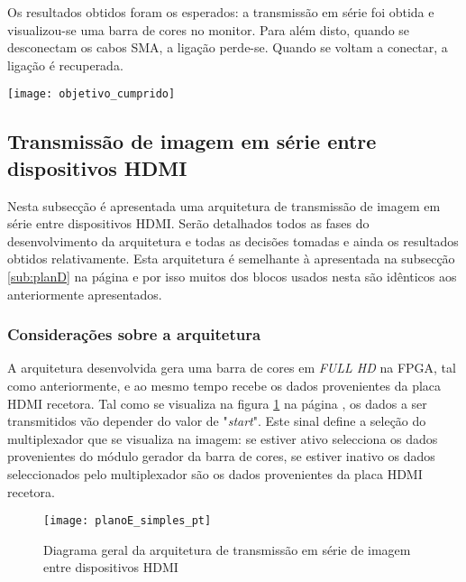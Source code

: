 Os resultados obtidos foram os esperados: a transmissão em série foi obtida e visualizou-se uma barra de cores no monitor. Para além disto, quando se desconectam os cabos SMA, a ligação perde-se. Quando se voltam a conectar, a ligação é recuperada.
\begin{marginfigure}%
	\texttt{[image: objetivo\_cumprido]}%
\end{marginfigure}%




\subsection{Transmissão de imagem em série entre dispositivos HDMI} \label{sub:planE}

Nesta subsecção é apresentada uma arquitetura de transmissão de imagem em série entre dispositivos HDMI. Serão detalhados todos as fases do desenvolvimento da arquitetura e todas as decisões tomadas e ainda os resultados obtidos relativamente. Esta arquitetura é semelhante à apresentada na subsecção \ref{sub:planD} na página \pageref{sub:planD} e por isso muitos dos blocos usados nesta são idênticos aos anteriormente apresentados.

\subsubsection{Considerações sobre a arquitetura} \label{subsub:planE_considerações}

A arquitetura desenvolvida gera uma barra de cores em \textit{FULL HD} na FPGA, tal como anteriormente, e ao mesmo tempo recebe os dados provenientes da placa HDMI recetora. Tal como se visualiza na figura \ref{fig:planE_simples} na página \pageref{fig:planE_simples}, os dados a ser transmitidos vão depender do valor de "\textit{start}". Este sinal define a seleção do multiplexador que se visualiza na imagem: se estiver ativo selecciona os dados provenientes do módulo gerador da barra de cores, se estiver inativo os dados seleccionados pelo multiplexador são os dados provenientes da placa HDMI recetora.

\begin{figure}[h!]
	\begin{center}
		\leavevmode
		\texttt{[image: planoE\_simples\_pt]}
		\captionsetup{width=1.0\linewidth}
		\caption[Diagrama geral da arquitetura de transmissão em série de imagem entre dispositivos HDMI]{Diagrama geral da arquitetura de transmissão em série de imagem entre dispositivos HDMI}
		\label{fig:planE_simples}
	\end{center}
\end{figure}



